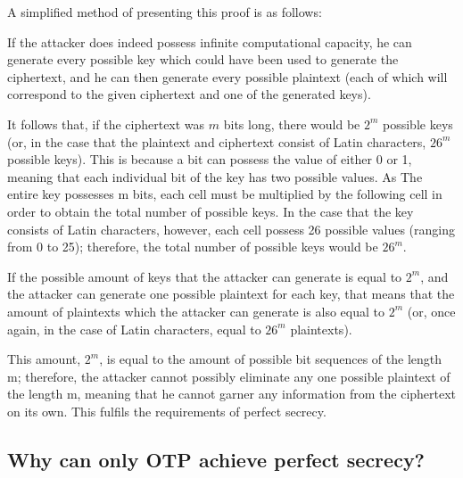 \documentclass[12pt]{report}
\begin{document}
A simplified method of presenting this proof is as follows:

If the attacker does indeed possess infinite computational capacity, he can generate every possible key which could have been used to generate the ciphertext, and he can then generate every possible plaintext (each of which will correspond to the given ciphertext and one of the generated keys).


It follows that, if the ciphertext was $m$ bits long, there would be $2^m$ possible keys (or, in the case that the plaintext and ciphertext consist of Latin characters, $26^m$ possible keys). This is because a bit can possess the value of either 0 or 1, meaning that each individual bit of the key has two possible values. As The entire key possesses m bits, each cell must be multiplied by the following cell in order to obtain the total number of possible keys. In the case that the key consists of Latin characters, however, each cell possess 26 possible values (ranging from 0 to 25); therefore, the total number of possible keys would be $26^m$.

If the possible amount of keys that the attacker can generate is equal to $2^m$, and the attacker can generate one possible plaintext for each key, that means that the amount of plaintexts which the attacker can generate is also equal to $2^m$ (or, once again, in the case of Latin characters, equal to $26^m$ plaintexts).

This amount, $2^m$, is equal to the amount of possible bit sequences of the length m; therefore, the attacker cannot possibly eliminate any one possible plaintext of the length m, meaning that he cannot garner any information from the ciphertext on its own. This fulfils the requirements of perfect secrecy.


\subsection{Why can only OTP achieve perfect secrecy?}
\end{document}
